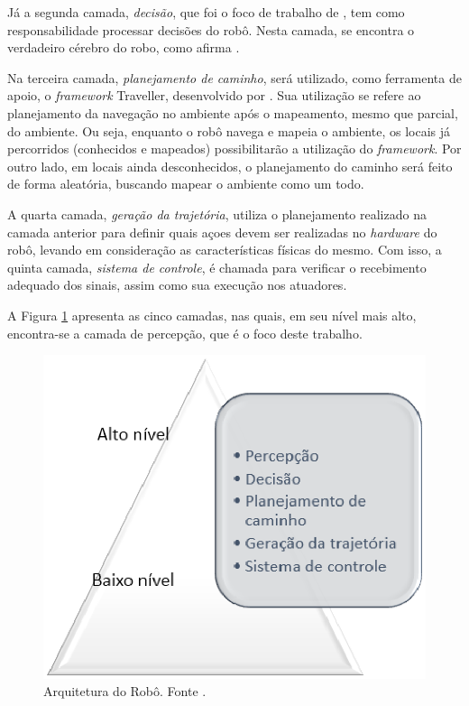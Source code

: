 Já a segunda camada, \textit{decisão}, que foi o foco de trabalho de \cite{tccCarol}, tem como responsabilidade processar decisões do
robô. Nesta camada, se encontra o verdadeiro cérebro do robo, como afirma \cite{vieira}.

Na terceira camada, \textit{planejamento de caminho}, será utilizado, como ferramenta de apoio, o \textit{framework} Traveller, desenvolvido por \cite{tccRodrigo}. Sua utilização se refere ao planejamento da navegação no ambiente após o mapeamento, mesmo que parcial, do ambiente. Ou seja, enquanto o robô navega e mapeia o ambiente, os locais já percorridos (conhecidos e mapeados) possibilitarão a utilização do \textit{framework}. Por outro lado, em locais ainda desconhecidos, o planejamento do caminho será feito de forma aleatória, buscando mapear o ambiente como um todo.

A quarta camada, \textit{geração da trajetória}, utiliza o planejamento realizado na camada anterior para definir quais açoes devem ser realizadas no \textit{hardware} do robô, levando em consideração as características físicas do mesmo. Com isso, a quinta camada, \textit{sistema de controle}, é chamada para verificar o recebimento adequado dos sinais, assim como sua execução nos atuadores.

A Figura \ref{img:camadas} apresenta as cinco camadas, nas quais, em seu nível mais alto, encontra-se a camada de percepção, que é o foco deste trabalho.

\begin{figure}[H]
	\centering
	\includegraphics[scale=0.6]{figuras/camadas.eps}
	\caption[Arquitetura do Robô]{Arquitetura do Robô. Fonte \cite{vieira}.}
	\label{img:camadas}
\end{figure}

